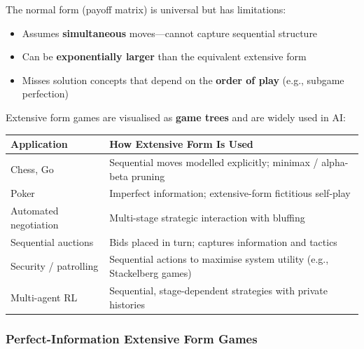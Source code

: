 \begin{defbox}
The normal form (payoff matrix) is universal but has limitations:
\begin{itemize}
  \item Assumes \textbf{simultaneous} moves---cannot capture sequential structure
  \item Can be \textbf{exponentially larger} than the equivalent extensive form
  \item Misses solution concepts that depend on the \textbf{order of play} (e.g., subgame perfection)
\end{itemize}

Extensive form games are visualised as \textbf{game trees} and are widely used in AI:
\begin{center}
\renewcommand{\arraystretch}{1.3}
\begin{tabular}{@{} l p{8.5cm} @{}}
\toprule
\textbf{Application} & \textbf{How Extensive Form Is Used} \\
\midrule
Chess, Go & Sequential moves modelled explicitly; minimax / alpha-beta pruning \\
Poker & Imperfect information; extensive-form fictitious self-play \\
Automated negotiation & Multi-stage strategic interaction with bluffing \\
Sequential auctions & Bids placed in turn; captures information and tactics \\
Security / patrolling & Sequential actions to maximise system utility (e.g., Stackelberg games) \\
Multi-agent RL & Sequential, stage-dependent strategies with private histories \\
\bottomrule
\end{tabular}
\end{center}
\end{defbox}

\separator

\subsubsection{Perfect-Information Extensive Form Games}


